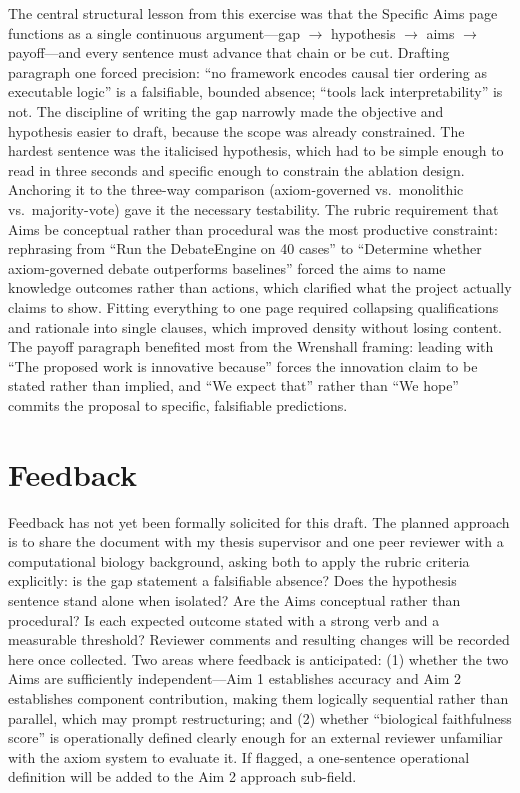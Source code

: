 \documentclass[11pt, letterpaper]{article}
\begin{document}
The central structural lesson from this exercise was that the Specific Aims page functions as
a single continuous argument---gap $\to$ hypothesis $\to$ aims $\to$ payoff---and every
sentence must advance that chain or be cut. Drafting paragraph one forced precision: ``no
framework encodes causal tier ordering as executable logic'' is a falsifiable, bounded absence;
``tools lack interpretability'' is not. The discipline of writing the gap narrowly made the
objective and hypothesis easier to draft, because the scope was already constrained. The
hardest sentence was the italicised hypothesis, which had to be simple enough to read in three
seconds and specific enough to constrain the ablation design. Anchoring it to the three-way
comparison (axiom-governed vs.\ monolithic vs.\ majority-vote) gave it the necessary
testability. The rubric requirement that Aims be conceptual rather than procedural was the
most productive constraint: rephrasing from ``Run the DebateEngine on 40 cases'' to
``Determine whether axiom-governed debate outperforms baselines'' forced the aims to name
knowledge outcomes rather than actions, which clarified what the project actually claims to
show. Fitting everything to one page required collapsing qualifications and rationale into
single clauses, which improved density without losing content. The payoff paragraph benefited
most from the Wrenshall framing: leading with ``The proposed work is innovative because''
forces the innovation claim to be stated rather than implied, and ``We expect that'' rather
than ``We hope'' commits the proposal to specific, falsifiable predictions.

\section*{Feedback}

Feedback has not yet been formally solicited for this draft. The planned approach is to share
the document with my thesis supervisor and one peer reviewer with a computational biology
background, asking both to apply the rubric criteria explicitly: is the gap statement a
falsifiable absence? Does the hypothesis sentence stand alone when isolated? Are the Aims
conceptual rather than procedural? Is each expected outcome stated with a strong verb and a
measurable threshold? Reviewer comments and resulting changes will be recorded here once
collected. Two areas where feedback is anticipated: (1) whether the two Aims are sufficiently
independent---Aim 1 establishes accuracy and Aim 2 establishes component contribution, making
them logically sequential rather than parallel, which may prompt restructuring; and (2)
whether ``biological faithfulness score'' is operationally defined clearly enough for an
external reviewer unfamiliar with the axiom system to evaluate it. If flagged, a one-sentence
operational definition will be added to the Aim 2 approach sub-field.
\end{document}
